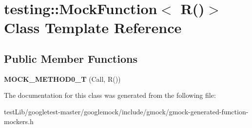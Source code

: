 \hypertarget{classtesting_1_1MockFunction_3_01R_07_08_4}{}\section{testing\+:\+:Mock\+Function$<$ R()$>$ Class Template Reference}
\label{classtesting_1_1MockFunction_3_01R_07_08_4}
\subsection*{Public Member Functions}
\begin{DoxyCompactItemize}
\item 
\mbox{\label{classtesting_1_1MockFunction_3_01R_07_08_4_a08e7016e3e060a5cd375b66ff0cc04e8}} 
{\bfseries M\+O\+C\+K\+\_\+\+M\+E\+T\+H\+O\+D0\+\_\+T} (Call, R())
\end{DoxyCompactItemize}


The documentation for this class was generated from the following file\+:\begin{DoxyCompactItemize}
\item 
test\+Lib/googletest-\/master/googlemock/include/gmock/gmock-\/generated-\/function-\/mockers.\+h\end{DoxyCompactItemize}

